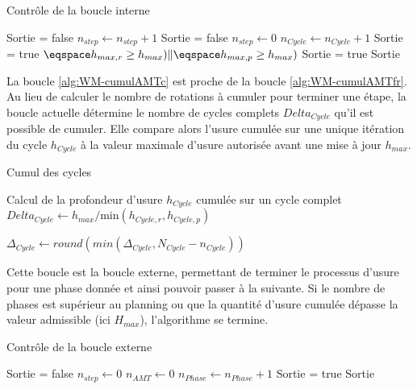 \begin{algorithm}
\caption{Contrôle de la boucle interne}
\label{alg:WM-exitInternalLoop}
  \begin{algorithmic}
  \State Sortie = false
      \State $n_{step}\gets n_{step}+1$
      \State Sortie = false
  \EndIf
      \State $n_{step}\gets 0$
      \State $n_{Cycle}\gets n_{Cycle}+1$
      \State Sortie = true
  \EndIf
  \If $\eqspace h_{max,r} \geq h_{max}) \Vert \eqspace h_{max,p} \geq h_{max})$
    \State Sortie = true
  \EndIf
  \State \Return Sortie
  \end{algorithmic}
\end{algorithm}
\FloatBarrier
La boucle \ref{alg:WM-cumulAMTc} est proche de la boucle \ref{alg:WM-cumulAMTfr}. Au lieu de calculer le nombre de rotations à cumuler pour terminer une étape, la boucle actuelle détermine le nombre de cycles complets $Delta_{Cycle}$ qu'il est possible de cumuler. Elle compare alors l'usure cumulée sur une unique itération du cycle $h_{Cycle}$ à la valeur maximale d'usure autorisée avant une mise à jour $h_{max}$.

\begin{algorithm}
\caption{Cumul des cycles}
\label{alg:WM-cumulAMTc}
  \begin{algorithmic}
    \Require Calcul de la profondeur d'usure $h_{Cycle}$ cumulée sur un cycle complet
    \State $Delta_{Cycle} \gets h_{max}/\text{min}(h_{Cycle,r},h_{Cycle,p}) $

  \State \Return $\Delta_{Cycle} \gets round(min(\Delta_{Cycle}, N_{Cycle}-n_{Cycle}))$
  \end{algorithmic}
\end{algorithm}
\FloatBarrier
Cette boucle est la boucle externe, permettant de terminer le processus d'usure pour une phase donnée et ainsi pouvoir passer à la suivante. Si le nombre de phases est supérieur au planning ou que la quantité d'usure cumulée dépasse la valeur admissible (ici $H_{max}$), l'algorithme se termine.
\begin{algorithm}
\caption{Contrôle de la boucle externe}
\label{alg:WM-exitExternalLoop}
  \begin{algorithmic}
  \State Sortie = false
      \State $n_{step}\gets 0$
      \State $n_{AMT}\gets 0$
      \State $n_{Phase}\gets n_{Phase}+1$
  \EndIf
  \State Sortie = true
  \EndIf
  \State \Return Sortie
  \end{algorithmic}
\end{algorithm}

